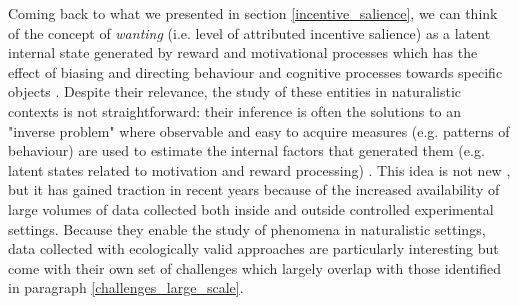 Coming back to what we presented in section \ref{incentive_salience}, we can think of the concept of \textit{wanting} (i.e. level of attributed incentive salience) as a latent internal state generated by reward and motivational processes which has the effect of biasing and directing behaviour and cognitive processes towards specific objects \cite{berridge2008affective}. Despite their relevance, the study of these entities in naturalistic contexts is not straightforward: their inference is often the solutions to an "inverse problem" \cite{bishop2006pattern} where observable and easy to acquire measures (e.g. patterns of behaviour) are used to estimate the internal factors that generated them (e.g. latent states related to motivation and reward processing) \cite{song2017reward,wang2018prefrontal}. This idea is not new \cite{spearman1961general}, but it has gained traction in recent years because of the increased availability of large volumes of data collected both inside and outside controlled experimental settings. Because they enable the study of phenomena in naturalistic settings, data collected with ecologically valid approaches are particularly interesting but come with their own set of challenges \cite{hashem2015rise} which largely overlap with those identified in paragraph \ref{challenges_large_scale}. 

